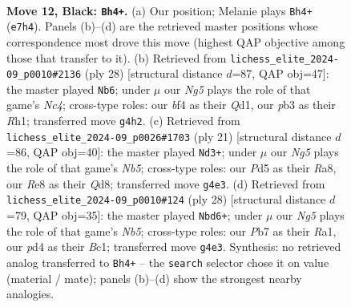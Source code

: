 \documentclass[11pt]{article}
\begin{document}
\begin{figure}[p]
\label{fig:thought-m21}
\end{figure}

\clearpage

\begin{figure}[p]\centering
\begin{subfigure}{0.46\textwidth}\centering
\resizebox{\linewidth}{!}{%
\newchessgame
\chessboard[
  setfen={rnbqr1k1/pp2bppp/2p5/3p4/P2P1Bn1/1PN1PP2/2Q1N1PP/R3KB1R b KQ - 0 12},
  showmover=false,
  pgfstyle=straightmove, color=movearrow, markmove={e7-h4}
]}
\caption{}
\end{subfigure}\hfill
\begin{subfigure}{0.46\textwidth}\centering
\resizebox{\linewidth}{!}{%
\newchessgame
\chessboard[
  setfen={r3kb1r/2qn1p2/p2p1np1/P2Pp1Bp/1pN5/7P/1PP2PP1/R2QKB1R w KQkq - 2 15},
  showmover=false,
  pgfstyle=straightmove, color=movearrow, markmove={c4-b6}
]}
\caption{}
\end{subfigure}
\\[4pt]
\begin{subfigure}{0.46\textwidth}\centering
\resizebox{\linewidth}{!}{%
\newchessgame
\chessboard[
  setfen={r2qkb1r/1p1n1ppp/p3p3/3p1b2/1n1P1B2/1QN1PN2/PP2BPPP/2R1K2R b Kkq - 1 11},
  showmover=false,
  pgfstyle=straightmove, color=movearrow, markmove={b4-d3}
]}
\caption{}
\end{subfigure}\hfill
\begin{subfigure}{0.46\textwidth}\centering
\resizebox{\linewidth}{!}{%
\newchessgame
\chessboard[
  setfen={rq2kb1r/pp1n1pp1/1np1p2p/1N2P3/3PN1b1/3B4/PPQ2PPP/R1B1K2R w KQkq - 4 15},
  showmover=false,
  pgfstyle=straightmove, color=movearrow, markmove={b5-d6}
]}
\caption{}
\end{subfigure}
\caption{\textbf{Move 12, Black: \texttt{Bh4+}.} (a) Our position; Melanie plays \texttt{Bh4+} (\texttt{e7h4}). Panels (b)--(d) are the retrieved master positions whose correspondence most drove this move (highest QAP objective among those that transfer to it). (b) Retrieved from \texttt{lichess\_elite\_2024-09\_p0010\#2136} (ply 28) [structural distance $d$=87, QAP obj=47]: the master played \texttt{Nb6}; under $\mu$ our \emph{Ng5} plays the role of that game's \emph{Nc4}; cross-type roles: our \emph{b}f4 as their \emph{Q}d1, our \emph{p}b3 as their \emph{R}h1; transferred move \texttt{g4h2}. (c) Retrieved from \texttt{lichess\_elite\_2024-09\_p0026\#1703} (ply 21) [structural distance $d$=86, QAP obj=40]: the master played \texttt{Nd3+}; under $\mu$ our \emph{Ng5} plays the role of that game's \emph{Nb5}; cross-type roles: our \emph{P}d5 as their \emph{R}a8, our \emph{R}e8 as their \emph{Q}d8; transferred move \texttt{g4e3}. (d) Retrieved from \texttt{lichess\_elite\_2024-09\_p0010\#124} (ply 28) [structural distance $d$=79, QAP obj=35]: the master played \texttt{Nbd6+}; under $\mu$ our \emph{Ng5} plays the role of that game's \emph{Nb5}; cross-type roles: our \emph{P}b7 as their \emph{R}a1, our \emph{p}d4 as their \emph{B}c1; transferred move \texttt{g4e3}. Synthesis: no retrieved analog transferred to \texttt{Bh4+} -- the \texttt{search} selector chose it on value (material / mate); panels (b)--(d) show the strongest nearby analogies.}
\label{fig:thought-m23}
\end{figure}
\end{document}
